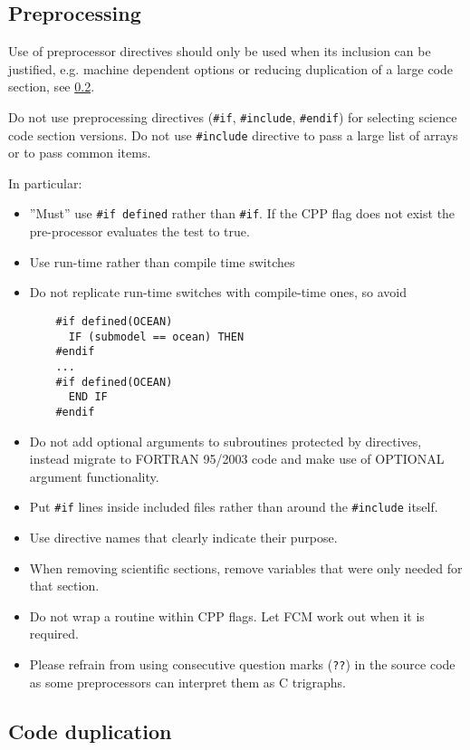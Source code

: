 \subsection{Preprocessing}\label{sec:cpp}

Use of preprocessor directives should only be used when its inclusion
can be justified, e.g. machine dependent options or reducing
duplication of a large code section, see \ref{sec:duplication}.

Do not use preprocessing directives (\verb|#if|, \verb|#include|,
\verb|#endif|) for selecting science code section versions. Do not use
\verb|#include| directive to pass a large list of arrays or to pass common items.

In particular:
\begin{itemize}
  \item ''Must'' use \verb|#if defined| rather than \verb|#if|. If the CPP flag does
not exist the pre-processor evaluates the test to true.
  \item Use run-time rather than compile time switches
  \item Do not replicate run-time switches with compile-time ones, so avoid
    \begin{verbatim}
    #if defined(OCEAN)
      IF (submodel == ocean) THEN
    #endif
    ...
    #if defined(OCEAN)
      END IF
    #endif
    \end{verbatim}

  \item Do not add optional arguments to subroutines protected by directives,
  instead migrate to FORTRAN 95/2003 code and make use of OPTIONAL argument functionality.
  \item Put \verb|#if| lines inside included files rather than around the \verb|#include| itself.
  \item Use directive names that clearly indicate their purpose.
  \item When removing scientific sections, remove variables that were only needed for that section.
  \item Do not wrap a routine within CPP flags. Let FCM work out when it is required.
  \item Please refrain from using consecutive question marks (\verb|??|) in the
  source code as some preprocessors can interpret them as C trigraphs.
\end{itemize}

\subsection{Code duplication}\label{sec:duplication}

